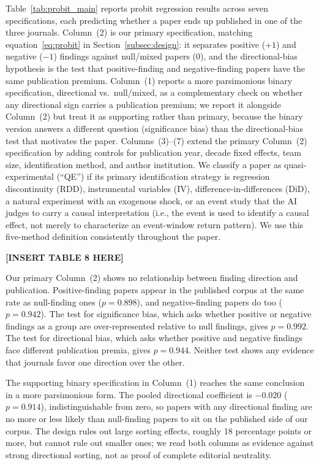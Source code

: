 \documentclass[12pt]{article}
\begin{document}
Table~\ref{tab:probit_main} reports probit regression results across seven
specifications, each predicting whether a paper ends up published in one of
the three journals.  Column~(2) is our primary specification, matching
equation~\eqref{eq:probit} in Section~\ref{subsec:design}: it separates
positive ($+1$) and negative ($-1$) findings against null/mixed papers
($0$), and the directional-bias hypothesis is the test that
positive-finding and negative-finding papers have the same
publication premium.  Column~(1) reports a more parsimonious
binary specification, directional vs.\ null/mixed, as a complementary
check on whether any directional sign carries a publication
premium; we report it alongside Column~(2) but treat it as supporting
rather than primary, because the binary version answers a different
question (significance bias) than the directional-bias test that motivates
the paper.  Columns~(3)--(7) extend the primary Column~(2) specification by
adding controls for publication year, decade fixed effects, team size,
identification method, and author institution.  We classify a paper as
quasi-experimental (``QE'') if its primary identification
strategy is regression discontinuity (RDD), instrumental variables (IV),
difference-in-differences (DiD), a natural experiment with an exogenous
shock, or an event study that the AI judges to carry a causal
interpretation (i.e., the event is used to identify a causal effect, not
merely to characterize an event-window return pattern).  We use
this five-method definition consistently throughout the paper.


\begin{center}
\textbf{[INSERT TABLE 8 HERE]}
\end{center}

Our primary Column~(2) shows no relationship between finding
direction and publication.  Positive-finding papers appear in the
published corpus at the same rate as null-finding ones
($p = 0.898$), and negative-finding papers do too ($p = 0.942$).
The test for significance bias, which asks whether positive or
negative findings as a group are over-represented relative to null
findings, gives $p = 0.992$.  The test for directional bias, which
asks whether positive and negative findings face different
publication premia, gives $p = 0.944$.  Neither test shows any
evidence that journals favor one direction over the other.

The supporting binary specification in Column~(1) reaches the same
conclusion in a more parsimonious form.  The pooled directional coefficient
is $-0.020$ ($p = 0.914$), indistinguishable from zero, so papers with any
directional finding are no more or less likely than null-finding papers to
sit on the published side of our corpus.  The design rules out large sorting
effects, roughly 18 percentage points or more, but cannot rule out
smaller ones; we read both columns as evidence against strong directional
sorting, not as proof of complete editorial neutrality.
\end{document}
